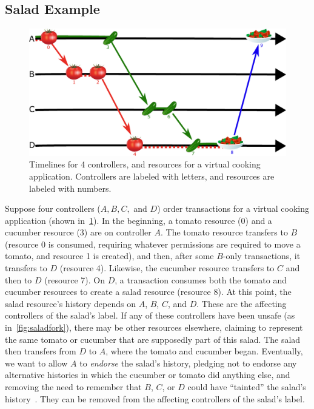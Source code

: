 \documentclass[a4paper,USenglish,cleveref, autoref, thm-restate, anonymous]{lipics-v2021}
\begin{document}
\subsection{Salad Example}
\begin{figure}
    \centering
    \includegraphics[width=\linewidth]{figs/salad_timeline.pdf}
    \caption{Timelines for 4 controllers, and resources for a virtual cooking application. Controllers are labeled with letters, and resources are labeled with numbers.}
    \label{fig:salad}
\end{figure}
Suppose four controllers ($A,B,C,$ and $D$) order transactions for a virtual cooking application (shown in~\cref{fig:salad}).
In the beginning, a tomato resource (0) and a cucumber resource (3) are on controller $A$.
The tomato resource transfers to $B$ (resource 0 is consumed, requiring whatever permissions are required to move a tomato, and resource 1 is created), and then, after some $B$-only transactions, it transfers to $D$ (resource 4).
Likewise, the cucumber resource transfers to $C$ and then to $D$ (resource 7).
On $D$, a transaction consumes both the tomato and cucumber resources to create a salad resource (resource 8). 
At this point, the salad resource's history depends on $A$, $B$, $C$, and $D$.
These are the affecting controllers of the salad's label.
If any of these controllers have been unsafe (as in~\cref{fig:saladfork}), there may be other resources elsewhere, claiming to represent the same tomato or cucumber that are supposedly part of this salad. 
The salad then transfers from $D$ to $A$, where the tomato and cucumber began.
Eventually, we want to allow $A$ to \emph{endorse} the salad's history, pledging not to endorse any alternative histories in which the cucumber or tomato did anything else, and removing the need to remember that $B$, $C$, or $D$ could have ``tainted'' the salad's history~\cite{dista}. 
They can be removed from the affecting controllers of the salad's label.
\end{document}
